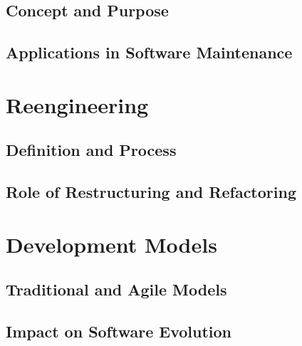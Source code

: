 \subsection{Concept and Purpose}



\subsection{Applications in Software Maintenance}











\section{Reengineering}
\cite{SoftwareEvolutionMens2008}


    
\subsection{Definition and Process}


\subsection{Role of Restructuring and Refactoring}





\section{Development Models}
\cite{DevelopmentModels2010}

\subsection{Traditional and Agile Models}

\subsection{Impact on Software Evolution}
